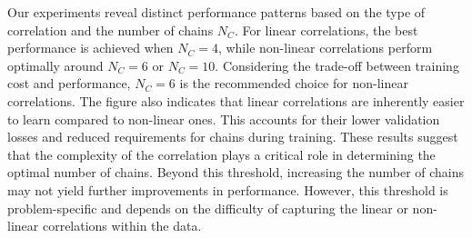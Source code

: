 Our experiments reveal distinct performance patterns based on the type of correlation and the number of chains $N_C$. For linear correlations, the best performance is achieved when $N_C=4$, while non-linear correlations perform optimally around $N_C=6$ or $N_C=10$. Considering the trade-off between training cost and performance, $N_C=6$ is the recommended choice for non-linear correlations. The figure also indicates that linear correlations are inherently easier to learn compared to non-linear ones. This accounts for their lower validation losses and reduced requirements for chains during training. These results suggest that the complexity of the correlation plays a critical role in determining the optimal number of chains. Beyond this threshold, increasing the number of chains may not yield further improvements in performance. However, this threshold is problem-specific and depends on the difficulty of capturing the linear or non-linear correlations within the data.

